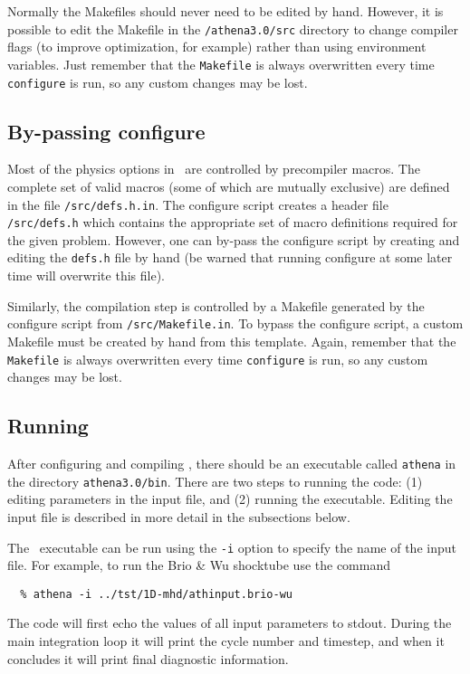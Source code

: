 Normally the Makefiles should never need to be edited by hand.  However,
it is possible to edit the Makefile in the {\tt /athena3.0/src} directory to
change compiler flags (to improve optimization, for example) rather than using
environment variables.  Just remember that the {\tt Makefile} is always 
overwritten every time {\tt configure} is run, so any custom changes may be
lost.

\subsection{By-passing configure}

Most of the physics options in \ath\ are controlled by precompiler macros.  The
complete set of valid macros (some of which are mutually exclusive) are
defined in the file {\tt /src/defs.h.in}.  
The configure script creates a header file {\tt /src/defs.h} which contains
the appropriate set of macro definitions required for the given problem.
However, one can by-pass the configure script by creating and editing the
{\tt defs.h} file by hand (be warned that running configure at some later time
will overwrite this file).

Similarly, the compilation step is controlled by a Makefile generated by
the configure script from {\tt /src/Makefile.in}.  To bypass the configure
script, a custom Makefile must be created by hand from this template.
Again, remember that the {\tt Makefile} is always
overwritten every time {\tt configure} is run, so any custom changes may be
lost.

\subsection{Running \ath}

After configuring and compiling \ath, there should be an executable
called {\tt athena} in the directory {\tt athena3.0/bin}.  There
are two steps to running the code: (1) editing parameters in the
input file, and (2) running the executable.  Editing the input file is 
described in more detail in the subsections below.

The \ath\ executable can be run using the {\tt -i} option to specify the name of
the input file.  For example, to run the Brio \& Wu shocktube use
the command
\footnotesize
\begin{verbatim}
  % athena -i ../tst/1D-mhd/athinput.brio-wu
\end{verbatim}
\normalsize
The code will first echo the values of all input parameters to stdout.
During the main integration loop
it will print the cycle number and timestep, and
when it concludes it will print final diagnostic information.

